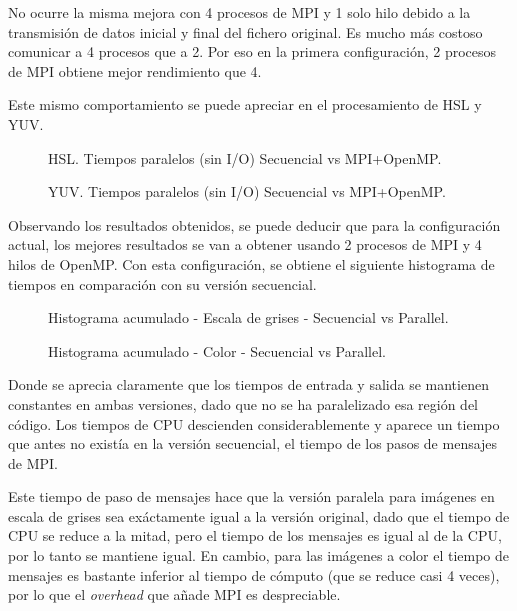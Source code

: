 \documentclass[12pt]{report} %
\begin{document}
No ocurre la misma mejora con 4 procesos de MPI y 1 solo hilo debido a la transmisión de datos inicial y
final del fichero original. Es mucho más costoso comunicar a 4 procesos que a 2. Por eso en la primera
configuración, 2 procesos de MPI obtiene mejor rendimiento que 4.

Este mismo comportamiento se puede apreciar en el procesamiento de HSL y YUV.

\begin{figure}[H]
	\makebox[\textwidth][c]{
        
    }
    \caption{HSL. Tiempos paralelos (sin I/O) Secuencial vs MPI+OpenMP.}
    \label{fig:hsl_tiempos}
\end{figure}

\begin{figure}[H]
	\makebox[\textwidth][c]{
        
    }
    \caption{YUV. Tiempos paralelos (sin I/O) Secuencial vs MPI+OpenMP.}
    \label{fig:yuv_tiempos}
\end{figure}

Observando los resultados obtenidos, se puede deducir que para la configuración actual, los mejores
resultados se van a obtener usando 2 procesos de MPI y 4 hilos de OpenMP. Con esta configuración, se
obtiene el siguiente histograma de tiempos en comparación con su versión secuencial.

\begin{figure}[H]
	\makebox[\textwidth][c]{
        
    }
    \caption{Histograma acumulado - Escala de grises - Secuencial vs Parallel.}
    \label{fig:hist_times_grey}
\end{figure}
\begin{figure}[H]
	\makebox[\textwidth][c]{
        
    }
    \caption{Histograma acumulado - Color - Secuencial vs Parallel.}
    \label{fig:hist_times_color}
\end{figure}

Donde se aprecia claramente que los tiempos de entrada y salida se mantienen constantes en ambas versiones,
dado que no se ha paralelizado esa región del código. Los tiempos de CPU descienden considerablemente y
aparece un tiempo que antes no existía en la versión secuencial, el tiempo de los pasos de mensajes de MPI.

Este tiempo de paso de mensajes hace que la versión paralela para imágenes en escala de grises sea
exáctamente igual a la versión original, dado que el tiempo de CPU se reduce a la mitad, pero el
tiempo de los mensajes es igual al de la CPU, por lo tanto se mantiene igual. En cambio, para las
imágenes a color el tiempo de mensajes es bastante inferior al tiempo de cómputo (que se reduce casi
4 veces), por lo que el \textit{overhead} que añade MPI es despreciable.
\end{document}
